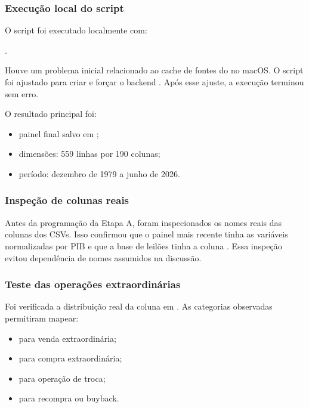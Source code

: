 \documentclass[12pt,a4paper]{article}
\begin{document}
\subsubsection{Execução local do script}

O script foi executado localmente com:
\begin{center}
.
\end{center}

Houve um problema inicial relacionado ao cache de fontes do  no
macOS. O script foi ajustado para criar  e forçar o
backend . Após esse ajuste, a execução terminou sem erro.

O resultado principal foi:

\begin{itemize}[leftmargin=1.2cm]
    \item painel final salvo em
    ;
    \item dimensões: 559 linhas por 190 colunas;
    \item período: dezembro de 1979 a junho de 2026.
\end{itemize}

\subsubsection{Inspeção de colunas reais}

Antes da programação da Etapa A, foram inspecionados os nomes reais das colunas dos
CSVs. Isso confirmou que o painel mais recente tinha as variáveis normalizadas por
PIB e que a base de leilões tinha a coluna . Essa inspeção evitou
dependência de nomes assumidos na discussão.

\subsubsection{Teste das operações extraordinárias}

Foi verificada a distribuição real da coluna  em
. As categorias observadas permitiram mapear:

\begin{itemize}[leftmargin=1.2cm]
    \item {} para venda extraordinária;
    \item {} para compra extraordinária;
    \item {} para operação de troca;
    \item {} para recompra ou buyback.
\end{itemize}
\end{document}
